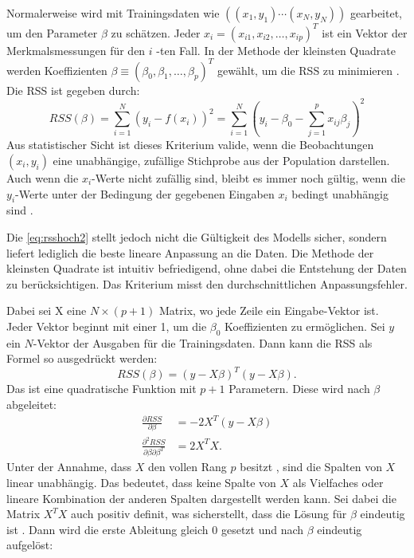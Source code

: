 Normalerweise wird mit Trainingsdaten wie \( ( (x_1, y_1) \cdots (x_N, y_N) ) \) gearbeitet, um den Parameter $\beta$ zu schätzen. Jeder \( x_i = (x_{i1}, x_{i2}, \ldots, x_{ip})^T \) ist ein Vektor der Merkmalsmessungen für den \(i\) -ten Fall. In der Methode der kleinsten Quadrate werden Koeffizienten \( \beta \equiv (\beta_0, \beta_1, \ldots, \beta_p)^T \) gewählt, um die \ac{RSS} zu minimieren \cite{hastie2009elements}. Die \ac{RSS} ist gegeben durch:
\begin{equation}
RSS(\beta) = \sum_{i=1}^{N} (y_i - f(x_i))^2 
= \sum_{i=1}^{N} \left( y_i - \beta_0 - \sum_{j=1}^{p} x_{ij} \beta_j \right)^2
\label{eq:rsshoch2}
\end{equation}
Aus statistischer Sicht ist dieses Kriterium valide, wenn die Beobachtungen \( (x_i, y_i) \) eine unabhängige, zufällige Stichprobe aus der Population darstellen. Auch wenn die \(x_i\)-Werte nicht zufällig sind, bleibt es immer noch gültig, wenn die \(y_i\)-Werte unter der Bedingung der gegebenen Eingaben \(x_i\) bedingt unabhängig sind \cite{hastie2009elements}.  \par
Die \autoref{eq:rsshoch2} stellt jedoch nicht die Gültigkeit des Modells sicher, sondern liefert lediglich die beste lineare Anpassung an die Daten. Die Methode der kleinsten Quadrate ist intuitiv befriedigend, ohne dabei die Entstehung der Daten zu berücksichtigen. Das Kriterium misst den durchschnittlichen Anpassungsfehler. \par
Dabei sei X eine \( N \times (p + 1) \) Matrix, wo jede Zeile ein Eingabe-Vektor ist. Jeder Vektor beginnt mit einer 1, um die $\beta_0$ Koeffizienten zu ermöglichen. Sei \(y\) ein \(N\)-Vektor der Ausgaben für die Trainingsdaten. Dann kann die \ac{RSS} als Formel so ausgedrückt werden: 
\begin{equation}
RSS(\beta) = (y - X\beta)^T (y - X\beta).
\label{eq:RSSmatrix}
\end{equation}
Das ist eine quadratische Funktion mit \(p + 1\) Parametern. Diese wird nach $\beta$ abgeleitet:
\begin{equation}
\begin{aligned}
\frac{\partial RSS}{\partial \beta} &= -2 X^T (y - X\beta) \\
\frac{\partial^2 RSS}{\partial \beta \partial \beta^T} &= 2 X^T X.
\end{aligned}
\label{eq:RSSableitung}
\end{equation}
Unter der Annahme, dass \( X \) den vollen Rang \( p \) besitzt \cite{huber1981robust}, sind die Spalten von \( X \) linear unabhängig. Das bedeutet, dass keine Spalte von \( X \) als Vielfaches oder lineare Kombination der anderen Spalten dargestellt werden kann. Sei dabei die Matrix \( X^T X \) auch positiv definit, was sicherstellt, dass die Lösung für \( \beta \) eindeutig ist \cite{hastie2009elements}. Dann wird die erste Ableitung gleich 0 gesetzt und nach $\beta$ eindeutig aufgelöst: 

